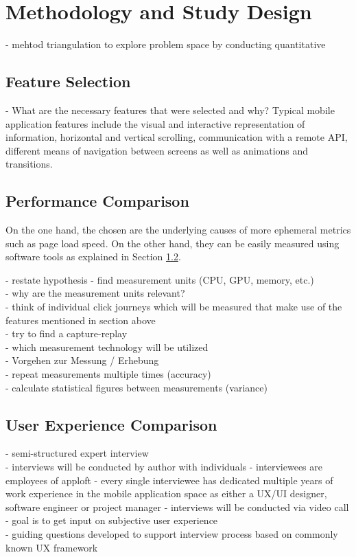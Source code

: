 \chapter{Methodology and Study Design}
- mehtod triangulation to explore problem space by conducting quantitative 

\section{Feature Selection} \label{section::feature_selection}
- What are the necessary features that were selected and why?
Typical mobile application features include the visual and interactive representation of information, horizontal and vertical scrolling, 
communication with a remote API, different means of navigation between screens 
as well as animations and transitions.

\section{Performance Comparison} \label{section::performance_comparison_design}
On the one hand, the chosen are the underlying causes of more ephemeral metrics such as page load speed. 
On the other hand, they can be easily measured using software tools as explained in Section \ref{section::performance_comparison_design}.


- restate hypothesis
- find measurement units (CPU, GPU, memory, etc.)\\
- why are the measurement units relevant?\\
- think of individual click journeys which will be measured that make use of the features mentioned in section above\\
- try to find a capture-replay\\
- which measurement technology will be utilized\\
- Vorgehen zur Messung / Erhebung\\
- repeat measurements multiple times (accuracy)\\


- calculate statistical figures between measurements (variance)\\


\section{User Experience Comparison}
- semi-structured expert interview\\
- interviews will be conducted by author with individuals
- interviewees are employees of apploft
- every single interviewee has dedicated multiple years of work experience in the mobile application space as either a UX/UI designer, software engineer or project manager
- interviews will be conducted via video call\\
- goal is to get input on subjective  user experience\\
- guiding questions developed to support interview process based on commonly known UX framework\\
